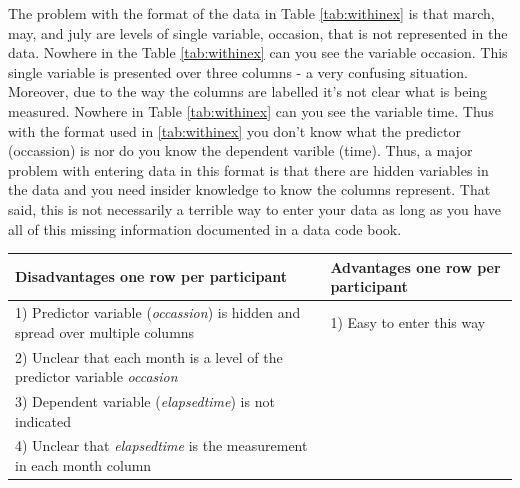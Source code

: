 \documentclass[
]{krantz}
\begin{document}
The problem with the format of the data in Table \ref{tab:withinex} is that march, may, and july are levels of single variable, occasion, that is not represented in the data. Nowhere in the Table \ref{tab:withinex} can you see the variable occasion. This single variable is presented over three columns - a very confusing situation. Moreover, due to the way the columns are labelled it's not clear what is being measured. Nowhere in Table \ref{tab:withinex} can you see the variable time. Thus with the format used in \ref{tab:withinex} you don't know what the predictor (occassion) is nor do you know the dependent varible (time). Thus, a major problem with entering data in this format is that there are hidden variables in the data and you need insider knowledge to know the columns represent. That said, this is not necessarily a terrible way to enter your data as long as you have all of this missing information documented in a data code book.

\begin{longtable}[]{@{}ll@{}}
\toprule
\begin{minipage}[b]{0.52\columnwidth}\raggedright
Disadvantages one row per participant\strut
\end{minipage} & \begin{minipage}[b]{0.42\columnwidth}\raggedright
Advantages one row per participant\strut
\end{minipage}\tabularnewline
\midrule
\endhead
\begin{minipage}[t]{0.52\columnwidth}\raggedright
1) Predictor variable (\emph{occassion}) is hidden and spread over multiple columns\strut
\end{minipage} & \begin{minipage}[t]{0.42\columnwidth}\raggedright
1) Easy to enter this way\strut
\end{minipage}\tabularnewline
\begin{minipage}[t]{0.52\columnwidth}\raggedright
2) Unclear that each month is a level of the predictor variable \emph{occasion}\strut
\end{minipage} & \begin{minipage}[t]{0.42\columnwidth}\raggedright
\strut
\end{minipage}\tabularnewline
\begin{minipage}[t]{0.52\columnwidth}\raggedright
3) Dependent variable (\emph{elapsedtime}) is not indicated\strut
\end{minipage} & \begin{minipage}[t]{0.42\columnwidth}\raggedright
\strut
\end{minipage}\tabularnewline
\begin{minipage}[t]{0.52\columnwidth}\raggedright
4) Unclear that \emph{elapsedtime} is the measurement in each month column\strut
\end{minipage} & \begin{minipage}[t]{0.42\columnwidth}\raggedright
\strut
\end{minipage}\tabularnewline
\bottomrule
\end{longtable}
\end{document}
